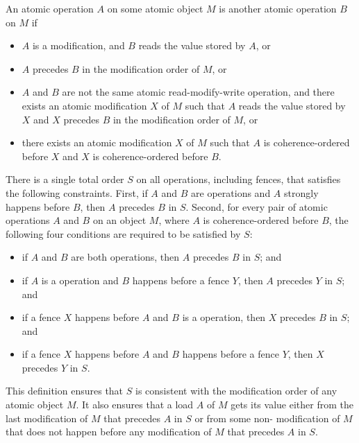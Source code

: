 \pnum
An atomic operation $A$ on some atomic object $M$ is
another atomic operation $B$ on $M$ if
\begin{itemize}
\item $A$ is a modification, and
$B$ reads the value stored by $A$, or
\item $A$ precedes $B$
in the modification order of $M$, or
\item $A$ and $B$ are not
the same atomic read-modify-write operation, and
there exists an atomic modification $X$ of $M$
such that $A$ reads the value stored by $X$ and
$X$ precedes $B$
in the modification order of $M$, or
\item there exists an atomic modification $X$ of $M$
such that $A$ is coherence-ordered before $X$ and
$X$ is coherence-ordered before $B$.
\end{itemize}

\pnum
There is a single total order $S$
on all  operations, including fences,
that satisfies the following constraints.
First, if $A$ and $B$ are
 operations and
$A$ strongly happens before $B$,
then $A$ precedes $B$ in $S$.
Second, for every pair of atomic operations $A$ and
$B$ on an object $M$,
where $A$ is coherence-ordered before $B$,
the following four conditions are required to be satisfied by $S$:
\begin{itemize}
\item if $A$ and $B$ are both
 operations,
then $A$ precedes $B$ in $S$; and
\item if $A$ is a  operation and
$B$ happens before
a  fence $Y$,
then $A$ precedes $Y$ in $S$; and
\item if a  fence $X$
happens before $A$ and
$B$ is a  operation,
then $X$ precedes $B$ in $S$; and
\item if a  fence $X$
happens before $A$ and
$B$ happens before
a  fence $Y$,
then $X$ precedes $Y$ in $S$.
\end{itemize}

\pnum
\begin{note}
This definition ensures that $S$ is consistent with
the modification order of any atomic object $M$.
It also ensures that
a  load $A$ of $M$
gets its value either from the last modification of $M$
that precedes $A$ in $S$ or
from some non- modification of $M$
that does not happen before any modification of $M$
that precedes $A$ in $S$.
\end{note}

